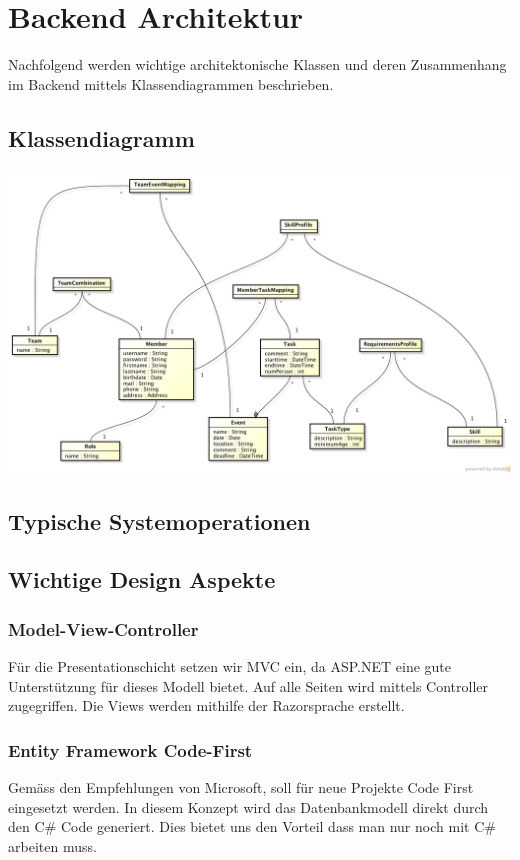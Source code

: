 \chapter{Backend Architektur}
	Nachfolgend werden wichtige architektonische Klassen und deren Zusammenhang im Backend mittels Klassendiagrammen beschrieben.

	\section{Klassendiagramm}
	\includegraphics[width=\textwidth]{content/architekturdokumentation/images/datenmodell.png}
	
	\section{Typische Systemoperationen}

	\section{Wichtige Design Aspekte}
		\subsection{Model-View-Controller}
		Für die Presentationschicht setzen wir MVC ein, da ASP.NET eine gute Unterstützung für dieses Modell bietet. Auf alle Seiten wird mittels Controller zugegriffen. Die Views werden mithilfe der Razorsprache erstellt.


		\subsection{Entity Framework Code-First}
		Gemäss den Empfehlungen von Microsoft, soll für neue Projekte Code First eingesetzt werden. In diesem Konzept wird das Datenbankmodell direkt durch den C\# Code generiert. Dies bietet uns den Vorteil dass man nur noch mit C\# arbeiten muss.